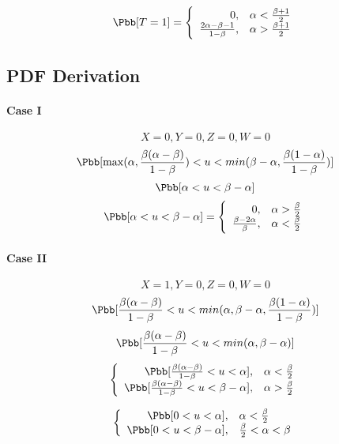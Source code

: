 \begin{displaymath}
\Pbb[T=1]=\left\{\begin{array}{rl}
0, & \alpha < \frac{\beta + 1}{2}\\
\frac{2\alpha-\beta-1}{1-\beta}, & \alpha > \frac{\beta + 1}{2}
\end{array}\right.
\end{displaymath}

\subsection{\ac{PDF} Derivation}

\paragraph{Case I}
\[X = 0, Y = 0, Z = 0, W = 0\]
\[\Pbb[\max(\alpha,\frac{\beta(\alpha - \beta)}{1-\beta})< u < min(\beta-\alpha,\frac{\beta(1-\alpha)}{1-\beta})]\]
\[\Pbb[\alpha < u < \beta - \alpha]\]
\begin{displaymath}
\Pbb[\alpha < u < \beta - \alpha]=\left\{\begin{array}{rl}
0, &\alpha > \frac{\beta}{2}\\
\frac{\beta-2\alpha}{\beta}, & \alpha < \frac{\beta}{2}
\end{array}\right.
\end{displaymath}

\paragraph{Case II}
\[X = 1, Y = 0, Z = 0, W = 0\]
\[\Pbb[\frac{\beta(\alpha - \beta)}{1-\beta} < u < min(\alpha,\beta-\alpha,\frac{\beta(1-\alpha)}{1-\beta})]\]
\[\Pbb[\frac{\beta(\alpha - \beta)}{1-\beta} < u < min(\alpha,\beta-\alpha)]\]
\begin{displaymath}
\left\{\begin{array}{rl}
\Pbb[\frac{\beta(\alpha - \beta)}{1-\beta} < u < \alpha], & \alpha < \frac{\beta}{2}\\
\Pbb[\frac{\beta(\alpha - \beta)}{1-\beta} < u < \beta-\alpha], & \alpha > \frac{\beta}{2}
\end{array}\right.
\end{displaymath}

\begin{displaymath}
\left\{\begin{array}{rl}
\Pbb[0 < u < \alpha], & \alpha < \frac{\beta}{2}\\
\Pbb[0 < u < \beta - \alpha], & \frac{\beta}{2} < \alpha < \beta
\end{array}\right.
\end{displaymath}

